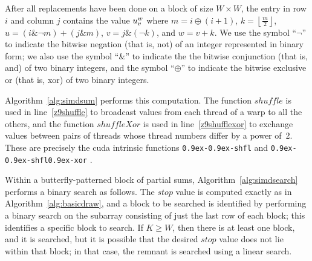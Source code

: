 \documentclass[10pt,nohyperref]{sigplanconf}
\newcommand*\Var[1]{{\mathit{#1}}}
\begin{document}
After all replacements have been done on a block of size $W \times W$,
the entry in row $i$ and column $j$ contains the value $\Z{u}{v}{w}$ where
$m = i \oplus (i+1)$,
$k = \left\lfloor \frac{m}{2} \right\rfloor$,
$u = (i \mathbin\& \mathord\neg m) + (j \mathbin\& m)$,
$v = j \mathbin\& (\mathord\neg k)$, and $w =v + k$.
We use the symbol ``$\mathord\neg$'' to indicate the bitwise negation (that is, {\sc not}) of an integer
represented in binary form; we also use the symbol ``$\mathbin\&$'' to indicate the
the bitwise conjunction (that is, {\sc and}) of two binary integers, and
the symbol ``$\oplus$'' to indicate
the bitwise exclusive {\sc or} (that is, {\sc xor}) of two binary integers.

Algorithm~\ref{alg:simdsum} performs this computation.  The function $\Var{shuffle}$ is used
in line~\ref{z9shuffle} to broadcast values from each thread of a warp to all the others,
and the function $\Var{shuffleXor}$ is used
in line~\ref{z9shufflexor} to exchange values between pairs of threads whose thread numbers
differ by a power of~2.  These are precisely the {\sc cuda} intrinsic functions
{\tt \lower0.9ex\hbox{-}\lower0.9ex\hbox{-}shfl} and {\tt \lower0.9ex\hbox{-}\lower0.9ex\hbox{-}shfl\lower0.9ex\hbox{-}xor}
\cite{CUDA-handbook,CUDA-website-shuffle-functions}.








Within a butterfly-patterned block of partial sums,
Algorithm~\ref{alg:simdsearch} performs a binary search as follows.
The $\Var{stop}$ value is computed exactly as in Algorithm~\ref{alg:basicdraw}, and a block to be searched is identified
by performing a binary search on the subarray consisting of just the last row of each block;
this identifies a specific block to search.  If $K \geq W$, then there is at least one block,
and it is searched, but it is possible that the desired $\Var{stop}$ value does not lie within that
block; in that case, the remnant is searched using a linear search.
\end{document}
